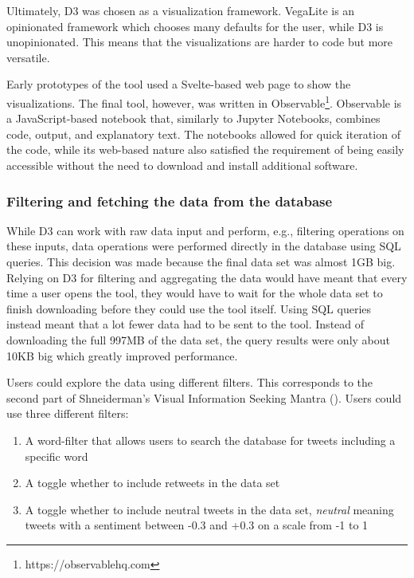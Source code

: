 Ultimately, D3 was chosen as a visualization framework. VegaLite is an opinionated framework which chooses many defaults for the user, while D3 is unopinionated. This means that the visualizations are harder to code but more versatile.

Early prototypes of the tool used a Svelte-based web page to show the visualizations. The final tool, however, was written in Observable\footnote{https://observablehq.com}. Observable is a JavaScript-based notebook that, similarly to Jupyter Notebooks, combines code, output, and explanatory text. The notebooks allowed for quick iteration of the code, while its web-based nature also satisfied the requirement of being easily accessible without the need to download and install additional software.

\subsubsection{Filtering and fetching the data from the database}
While D3 can work with raw data input and perform, e.g., filtering operations on these inputs, data operations were performed directly in the database using SQL queries. This decision was made because the final data set was almost 1GB big. Relying on D3 for filtering and aggregating the data would have meant that every time a user opens the tool, they would have to wait for the whole data set to finish downloading before they could use the tool itself. Using SQL queries instead meant that a lot fewer data had to be sent to the tool. Instead of downloading the full 997MB of the data set, the query results were only about 10KB big which greatly improved performance.

Users could explore the data using different filters. This corresponds to the second part of Shneiderman's Visual Information Seeking Mantra  (\cite[337]{shneidermanEyesHaveIt1996}). Users could use three different filters:

\begin{enumerate}
    \item A word-filter that allows users to search the database for tweets including a specific word
    \item A toggle whether to include retweets in the data set
    \item A toggle whether to include neutral tweets in the data set, \emph{neutral} meaning tweets with a sentiment between -0.3 and +0.3 on a scale from -1 to 1 %
\end{enumerate}

